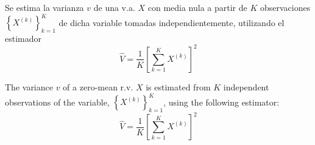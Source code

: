 \ifspanish

\question Se estima la varianza $v$ de una v.a. $X$ con media nula a partir de $K$ observaciones $\left\lbrace X^{(k)} \right\rbrace_{k=1}^{K} $  de dicha variable tomadas independientemente, utilizando el estimador 
 $$\hat{V}=\frac{1}{K}\left[\sum_{k=1}^K X^{(k)}\right]^2$$ 

\begin{solution}
  \end{solution}

\else

\question The variance $v$ of a zero-mean r.v. $X$ is estimated from $K$ independent observations of the variable, $\left\lbrace X^{(k)} \right\rbrace_{k=1}^{K}$, using the following estimator:
 $$\hat{V}=\frac{1}{K}\left[\sum_{k=1}^K X^{(k)}\right]^2$$ 

\begin{solution}
\end{solution}

\fi